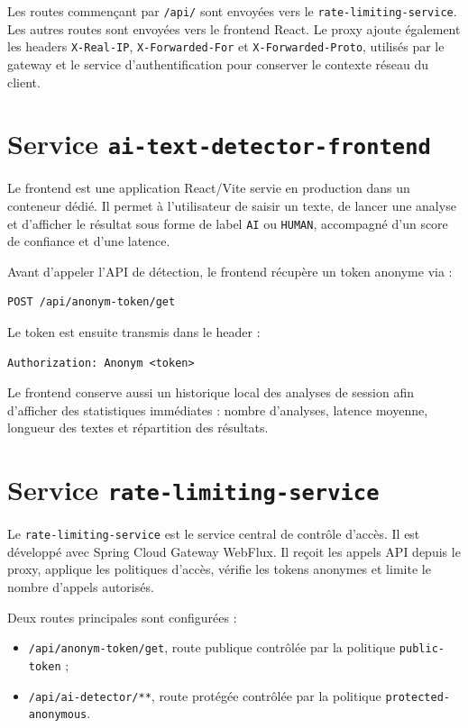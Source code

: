 ﻿\documentclass[12pt, a4paper]{report}
\begin{document}
Les routes commençant par \texttt{/api/} sont envoyées vers le
\texttt{rate-limiting-service}. Les autres routes sont envoyées vers le frontend
React. Le proxy ajoute également les headers \texttt{X-Real-IP},
\texttt{X-Forwarded-For} et \texttt{X-Forwarded-Proto}, utilisés par le gateway et
le service d'authentification pour conserver le contexte réseau du client.

\section{Service \texttt{ai-text-detector-frontend}}

Le frontend est une application React/Vite servie en production dans un
conteneur dédié. Il permet à l'utilisateur de saisir un texte, de lancer une
analyse et d'afficher le résultat sous forme de label \texttt{AI} ou
\texttt{HUMAN}, accompagné d'un score de confiance et d'une latence.

Avant d'appeler l'API de détection, le frontend récupère un token anonyme via :

\begin{verbatim}
POST /api/anonym-token/get
\end{verbatim}

Le token est ensuite transmis dans le header :

\begin{verbatim}
Authorization: Anonym <token>
\end{verbatim}

Le frontend conserve aussi un historique local des analyses de session afin
d'afficher des statistiques immédiates : nombre d'analyses, latence moyenne,
longueur des textes et répartition des résultats.

\section{Service \texttt{rate-limiting-service}}

Le \texttt{rate-limiting-service} est le service central de contrôle d'accès.
Il est développé avec Spring Cloud Gateway WebFlux. Il reçoit les appels API
depuis le proxy, applique les politiques d'accès, vérifie les tokens anonymes et
limite le nombre d'appels autorisés.

Deux routes principales sont configurées :

\begin{itemize}
  \item \texttt{/api/anonym-token/get}, route publique contrôlée par la politique
        \texttt{public-token} ;
  \item \texttt{/api/ai-detector/**}, route protégée contrôlée par la politique
        \texttt{protected-anonymous}.
\end{itemize}
\end{document}
